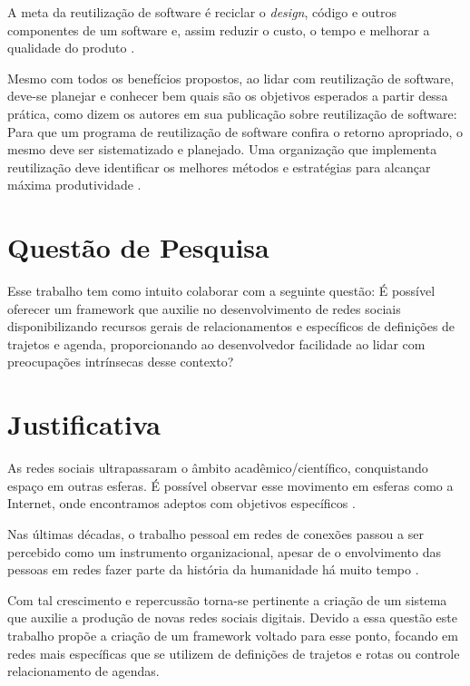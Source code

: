 A meta da reutilização de software é reciclar o \textit{design}, código e outros componentes de um software e, assim reduzir o custo, o tempo e melhorar a qualidade do produto \cite{Keswani:Joshi:Jatain:2014}.

Mesmo com todos os benefícios propostos, ao lidar com reutilização de software, deve-se planejar e conhecer bem quais são os objetivos esperados a partir dessa prática, como dizem os autores em sua publicação sobre reutilização de software: Para que um programa de reutilização de software confira o retorno apropriado, o mesmo deve ser sistematizado e planejado. Uma organização que implementa reutilização deve identificar os melhores métodos e estratégias para alcançar máxima produtividade \cite{Keswani:Joshi:Jatain:2014}.

\section{Questão de Pesquisa}

Esse trabalho tem como intuito colaborar com a seguinte questão: É possível oferecer um framework que auxilie no desenvolvimento de redes sociais disponibilizando recursos gerais de relacionamentos e específicos de definições de trajetos e agenda, proporcionando ao desenvolvedor facilidade ao lidar com preocupações intrínsecas desse contexto?

\section{Justificativa}

As redes sociais ultrapassaram o âmbito acadêmico/científico, conquistando espaço em outras esferas. É possível observar esse movimento em esferas como a Internet, onde encontramos adeptos com objetivos específicos \cite{Tomae:Alcara:Chiara:2005}.

Nas últimas décadas, o trabalho pessoal em redes de conexões passou a ser percebido como um instrumento organizacional, apesar de o envolvimento das pessoas em redes fazer parte da história da humanidade há muito tempo \cite{Tomae:Alcara:Chiara:2005}.

Com tal crescimento e repercussão torna-se pertinente a criação de um sistema que auxilie a produção de novas redes sociais digitais. Devido a essa questão este trabalho propõe a criação de um framework voltado para esse ponto, focando em redes mais específicas que se utilizem de definições de trajetos e rotas ou controle relacionamento de agendas.

